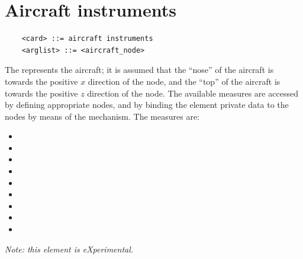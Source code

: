 \section{Aircraft instruments}
\begin{verbatim}
    <card> ::= aircraft instruments
    <arglist> ::= <aircraft_node>
\end{verbatim}
The  represents the aircraft; it is assumed
that the ``nose'' of the aircraft is towards the positive $x$ direction
of the node, and the ``top'' of the aircraft is towards the positive 
$z$ direction of the node.
The available measures are accessed by defining appropriate 
 nodes, and by binding the  
element private data to the nodes by means of the  mechanism.
The measures are:
\begin{itemize}
	\item {}
	\item {}
	\item {}
	\item {}
	\item {}
	\item {}
	\item {}
	\item {}
	\item {}
\end{itemize}

\noindent
\emph{Note: this element is eXperimental.}




